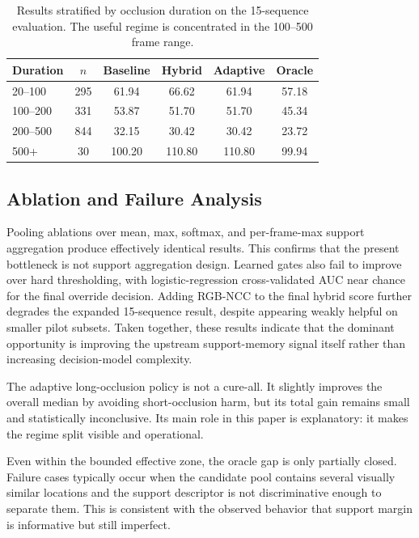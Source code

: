 \documentclass[10pt,journal,compsoc]{IEEEtran}
\begin{document}
\begin{table}[t]
    \centering
    \caption{Results stratified by occlusion duration on the 15-sequence evaluation. The useful regime is concentrated in the 100--500 frame range.}
    \label{tab:stratified_occ}
    \setlength{\tabcolsep}{4pt}
    \begin{tabular}{lccccc}
        \toprule
        Duration & $n$ & Baseline & Hybrid & Adaptive & Oracle \\
        \midrule
        20--100 & 295 & 61.94 & 66.62 & 61.94 & 57.18 \\
        100--200 & 331 & 53.87 & 51.70 & 51.70 & 45.34 \\
        200--500 & 844 & 32.15 & 30.42 & 30.42 & 23.72 \\
        500+ & 30 & 100.20 & 110.80 & 110.80 & 99.94 \\
        \bottomrule
    \end{tabular}
\end{table}

\subsection{Ablation and Failure Analysis}

Pooling ablations over mean, max, softmax, and per-frame-max support aggregation produce effectively identical results. This confirms that the present bottleneck is not support aggregation design. Learned gates also fail to improve over hard thresholding, with logistic-regression cross-validated AUC near chance for the final override decision. Adding RGB-NCC to the final hybrid score further degrades the expanded 15-sequence result, despite appearing weakly helpful on smaller pilot subsets. Taken together, these results indicate that the dominant opportunity is improving the upstream support-memory signal itself rather than increasing decision-model complexity.

The adaptive long-occlusion policy is not a cure-all. It slightly improves the overall median by avoiding short-occlusion harm, but its total gain remains small and statistically inconclusive. Its main role in this paper is explanatory: it makes the regime split visible and operational.

Even within the bounded effective zone, the oracle gap is only partially closed. Failure cases typically occur when the candidate pool contains several visually similar locations and the support descriptor is not discriminative enough to separate them. This is consistent with the observed behavior that support margin is informative but still imperfect.
\end{document}
